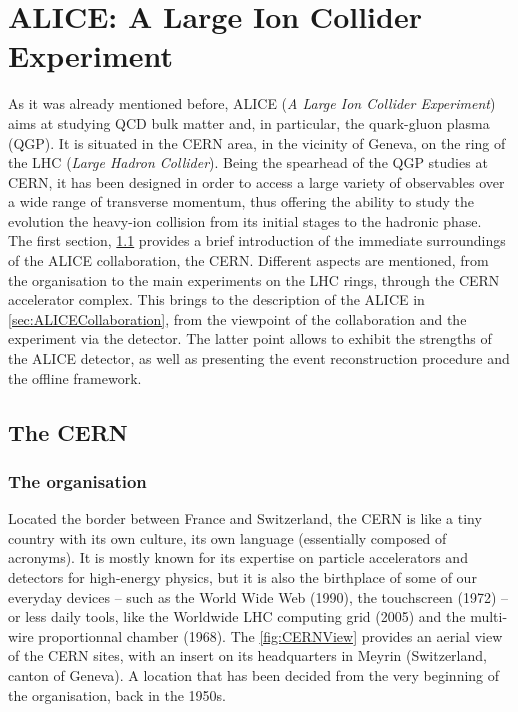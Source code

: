 \newpage
\chapter{ALICE: A Large Ion Collider Experiment}
\label{chap:ALICE}

As it was already mentioned before, ALICE (\textit{A Large Ion Collider Experiment})  aims at studying QCD bulk matter and, in particular, the quark-gluon plasma (QGP). It is situated in the CERN area, in the vicinity of Geneva, on the ring of the LHC (\textit{Large Hadron Collider}). Being the spearhead of the QGP studies at CERN, it has been designed in order to access a large variety of observables over a wide range of transverse momentum, thus offering the ability to study the evolution the heavy-ion collision from its initial stages to the hadronic phase.\\

The first section, \Sec\ref{sec:CERN} provides a brief introduction of the immediate surroundings of the ALICE collaboration, the CERN. Different aspects are mentioned, from the organisation to the main experiments on the LHC rings, through the CERN accelerator complex. This brings to the description of the ALICE in \Sec\ref{sec:ALICECollaboration}, from the viewpoint of the collaboration and the experiment via the detector. The latter point allows to exhibit the strengths of the ALICE detector, as well as presenting the event reconstruction procedure and the offline framework.


\section{The CERN}
\label{sec:CERN}

\subsection{The organisation}

Located the border between France and Switzerland, the CERN is like a tiny country with its own culture, its own language (essentially composed of acronyms). It is mostly known for its expertise on particle accelerators and detectors for high-energy physics, but it is also the birthplace of some of our everyday devices -- such as the World Wide Web (1990), the touchscreen (1972) -- or less daily tools, like the Worldwide LHC computing grid (2005) and the multi-wire proportionnal chamber (1968). The \fig\ref{fig:CERNView} provides an aerial view of the CERN sites, with an insert on its headquarters in Meyrin (Switzerland, canton of Geneva). A location that has been decided from the very beginning of the organisation, back in the 1950s.\\

